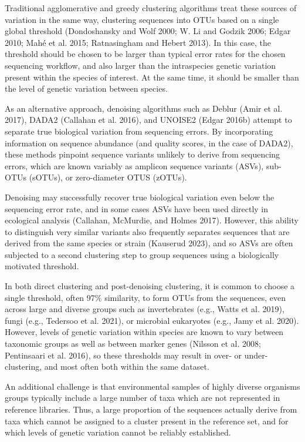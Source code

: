 \documentclass[
]{article}
\begin{document}
Traditional agglomerative and greedy clustering algorithms treat these sources of variation in the same way, clustering sequences into OTUs based on a single global threshold (Dondoshansky and Wolf 2000; W. Li and Godzik 2006; Edgar 2010; Mahé et al. 2015; Ratnasingham and Hebert 2013).
In this case, the threshold should be chosen to be larger than typical error rates for the chosen sequencing workflow, and also larger than the intraspecies genetic variation present within the species of interest.
At the same time, it should be smaller than the level of genetic variation between species.

As an alternative approach, denoising algorithms such as Deblur (Amir et al. 2017), DADA2 (Callahan et al. 2016), and UNOISE2 (Edgar 2016b) attempt to separate true biological variation from sequencing errors.
By incorporating information on sequence abundance (and quality scores, in the case of DADA2), these methods pinpoint sequence variants unlikely to derive from sequencing errors, which are known variably as amplicon sequence variants (ASVs), sub-OTUs (sOTUs), or zero-diameter OTUS (zOTUs).

Denoising may successfully recover true biological variation even below the sequencing error rate, and in some cases ASVs have been used directly in ecological analysis (Callahan, McMurdie, and Holmes 2017).
However, this ability to distinguish very similar variants also frequently separates sequences that are derived from the same species or strain (Kauserud 2023), and so ASVs are often subjected to a second clustering step to group sequences using a biologically motivated threshold.

In both direct clustering and post-denoising clustering, it is common to choose a single threshold, often 97\% similarity, to form OTUs from the sequences, even across large and diverse groups such as invertebrates (e.g., Watts et al. 2019), fungi (e.g., Tedersoo et al. 2021), or microbial eukaryotes (e.g., Jamy et al. 2020).
However, levels of genetic variation within species are known to vary between taxonomic groups as well as between marker genes (Nilsson et al. 2008; Pentinsaari et al. 2016), so these thresholds may result in over- or under-clustering, and most often both within the same dataset.

An additional challenge is that environmental samples of highly diverse organisms groups typically include a large number of taxa which are not represented in reference libraries.
Thus, a large proportion of the sequences actually derive from taxa which cannot be assigned to a cluster present in the reference set, and for which levels of genetic variation cannot be reliably established.
\end{document}
